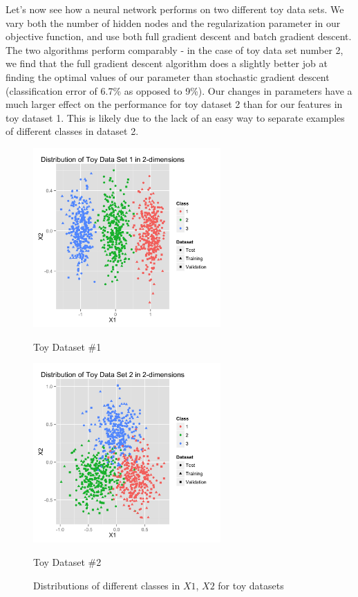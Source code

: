 \documentclass[10pt]{article}
\begin{document}
Let's now see how a neural network performs on two different toy data sets. We vary both the number of hidden nodes and the regularization parameter in our objective function, and use both full gradient descent and batch gradient descent. The two algorithms perform comparably - in the case of toy data set number 2, we find that the full gradient descent algorithm does a slightly better job at finding the optimal values of our parameter than stochastic gradient descent (classification error of 6.7\% as opposed to 9\%). Our changes in parameters have a much larger effect on the performance for toy dataset 2 than for our features in toy dataset 1. This is likely due to the lack of an easy way to separate examples of different classes in dataset 2.

\begin{figure}[ht]
	\centering
	\begin{minipage}[b]{.48\linewidth}
		\includegraphics[width=1\linewidth, height=2.7in]{t1dist.jpg}
		\caption*{Toy Dataset \#1}
	\end{minipage}
	\begin{minipage}[b]{.48\linewidth}
		\includegraphics[width=1\linewidth, height=2.7in]{t2dist.jpg}
		\caption*{Toy Dataset \#2}
	\end{minipage}
	\caption{Distributions of different classes in $X1$, $X2$ for toy datasets}
\end{figure}
\end{document}
